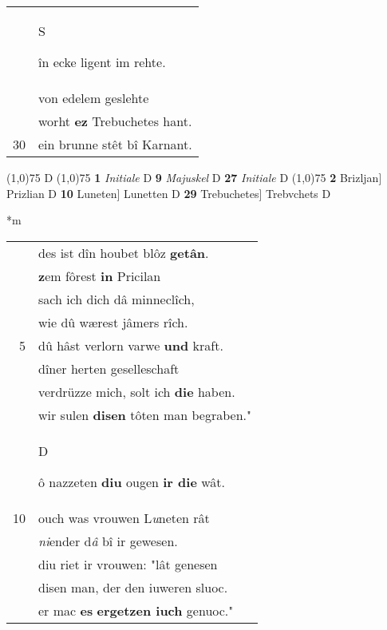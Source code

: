 \documentclass[8pt,a4paper,notitlepage]{article}
\begin{document}
\begin{table}[ht]
\begin{minipage}[t]{0.5\linewidth}
\begin{tabular}{rl}
 & \begin{large}S\end{large}în ecke ligent im rehte.\\ 
 & von edelem geslehte\\ 
 & worht \textbf{ez} Trebuchetes hant.\\ 
30 & ein brunne stêt bî Karnant.\\ 
\end{tabular}
\scriptsize
\line(1,0){75} \newline
D \newline
\line(1,0){75} \newline
\textbf{1} \textit{Initiale} D  \textbf{9} \textit{Majuskel} D  \textbf{27} \textit{Initiale} D  \newline
\line(1,0){75} \newline
\textbf{2} Brizljan] Prizlian D \textbf{10} Luneten] Lunetten D \textbf{29} Trebuchetes] Trebvchets D \newline
\end{minipage}
\hspace{0.5cm}
\begin{minipage}[t]{0.5\linewidth}
\small
\begin{center}*m
\end{center}
\begin{tabular}{rl}
 & des ist dîn houbet blôz \textbf{getân}.\\ 
 & \textbf{z}em fôrest \textbf{in} Pricilan\\ 
 & sach ich dich dâ minneclîch,\\ 
 & wie dû wærest jâmers rîch.\\ 
5 & dû hâst verlorn varwe \textbf{und} kraft.\\ 
 & dîner herten geselleschaft\\ 
 & verdrüzze mich, solt ich \textbf{die} haben.\\ 
 & wir sulen \textbf{disen} tôten man begraben."\\ 
 & \begin{large}D\end{large}ô nazzeten \textbf{diu} ougen \textbf{ir die} wât.\\ 
10 & ouch was vrouwen L\textit{u}neten rât\\ 
 & \textit{ni}ender d\textit{â} bî ir gewesen.\\ 
 & diu riet ir vrouwen: "lât genesen\\ 
 & disen man, der den iuweren sluoc.\\ 
 & er mac \textbf{es} \textbf{ergetzen iuch} genuoc."\\ 

\end{tabular}
\end{minipage}
\end{table}
\end{document}
